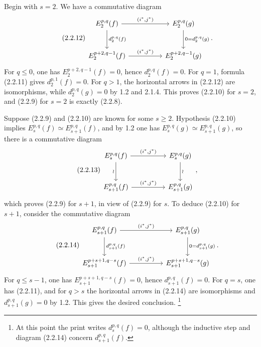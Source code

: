 Begin with $s=2$. We have a commutative diagram
\begin{equation}\tag{2.2.12}
\begin{tikzcd}[column sep=huge,row sep=large]
E_2^{p,q}(f)
  \arrow[r,"{(i^*,j^*)}"]
  \arrow[d,"{d_2^{p,q}(f)}"]
&
E_2^{p,q}(g)
  \arrow[d,"{0=d_2^{p,q}(g)}"]
\\
E_2^{p+2,q-1}(f)
  \arrow[r,"{(i^*,j^*)}"]
&
E_2^{p+2,q-1}(g)
\end{tikzcd}.
\end{equation}
For $q\leq0$, one has $E_2^{p+2,q-1}(f)=0$, hence
$d_2^{p,q}(f)=0$. For $q=1$, formula (2.2.11) gives
$d_2^{p,1}(f)=0$. For $q>1$, the horizontal arrows in (2.2.12) are
isomorphisms, while $d_2^{p,q}(g)=0$ by 1.2 and 2.1.4. This proves
(2.2.10) for $s=2$, and (2.2.9) for $s=2$ is exactly (2.2.8).

Suppose (2.2.9) and (2.2.10) are known for some $s\geq2$. Hypothesis
(2.2.10) implies
$E_s^{p,q}(f)\simeq E_{s+1}^{p,q}(f)$, and by 1.2 one has
$E_s^{p,q}(g)\simeq E_{s+1}^{p,q}(g)$, so there is a commutative diagram
\begin{equation}\tag{2.2.13}
\begin{tikzcd}[column sep=huge,row sep=large]
E_s^{p,q}(f)
  \arrow[r,"{(i^*,j^*)}"]
  \arrow[d,"\wr"']
&
E_s^{p,q}(g)
  \arrow[d,"\wr"]
\\
E_{s+1}^{p,q}(f)
  \arrow[r,"{(i^*,j^*)}"]
&
E_{s+1}^{p,q}(g)
\end{tikzcd},
\end{equation}
which proves (2.2.9) for $s+1$, in view of (2.2.9) for $s$. To deduce
(2.2.10) for $s+1$, consider the commutative diagram
\begin{equation}\tag{2.2.14}
\begin{tikzcd}[column sep=huge,row sep=large]
E_{s+1}^{p,q}(f)
  \arrow[r,"{(i^*,j^*)}"]
  \arrow[d,"{d_{s+1}^{p,q}(f)}"]
&
E_{s+1}^{p,q}(g)
  \arrow[d,"{0=d_{s+1}^{p,q}(g)}"]
\\
E_{s+1}^{p+s+1,q-s}(f)
  \arrow[r,"{(i^*,j^*)}"]
&
E_{s+1}^{p+s+1,q-s}(g)
\end{tikzcd}.
\end{equation}
For $q\leq s-1$, one has $E_{s+1}^{p+s+1,q-s}(f)=0$, hence
$d_{s+1}^{p,q}(f)=0$. For $q=s$, one has (2.2.11), and for $q>s$ the
horizontal arrows in (2.2.14) are isomorphisms and
$d_{s+1}^{p,q}(g)=0$ by 1.2. This gives the desired conclusion.
\footnote{At this point the print writes $d_s^{p,q}(f)=0$, although the
inductive step and diagram (2.2.14) concern $d_{s+1}^{p,q}(f)$.}

